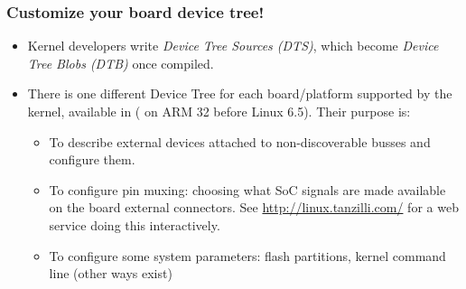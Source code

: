 \begin{frame}
  \frametitle{Customize your board device tree!}
  \begin{itemize}
  \item Kernel developers write {\em Device Tree Sources (DTS)},
    which become {\em Device Tree Blobs (DTB)} once compiled.
  \item There is one different Device Tree for each board/platform
    supported by the kernel, available in
    ( on ARM 32 before Linux 6.5).
    Their purpose is:
    \begin{itemize}
    \item To describe external devices attached to non-discoverable
      busses and configure them.
    \item To configure pin muxing: choosing what SoC signals are
      made available on the board external connectors.
      See \url{http://linux.tanzilli.com/} for a web service doing this
      interactively.
    \item To configure some system parameters: flash partitions,
      kernel command line (other ways exist)
    \end{itemize}
  \end{itemize}
\end{frame}
